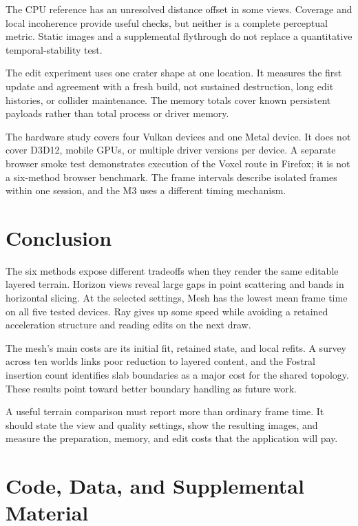 \documentclass{jcgt}
\begin{document}
The CPU reference has an unresolved distance offset in some views. Coverage and local incoherence provide useful checks, but neither is a complete perceptual metric. Static images and a supplemental flythrough do not replace a quantitative temporal-stability test.

The edit experiment uses one crater shape at one location. It measures the first update and agreement with a fresh build, not sustained destruction, long edit histories, or collider maintenance. The memory totals cover known persistent payloads rather than total process or driver memory.

The hardware study covers four Vulkan devices and one Metal device. It does not cover D3D12, mobile GPUs, or multiple driver versions per device. A separate browser smoke test demonstrates execution of the Voxel route in Firefox; it is not a six-method browser benchmark. The frame intervals describe isolated frames within one session, and the M3 uses a different timing mechanism.

\section{Conclusion}\label{sec:conclusion}

The six methods expose different tradeoffs when they render the same editable layered terrain. Horizon views reveal large gaps in point scattering and bands in horizontal slicing. At the selected settings, Mesh has the lowest mean frame time on all five tested devices. Ray gives up some speed while avoiding a retained acceleration structure and reading edits on the next draw.

The mesh's main costs are its initial fit, retained state, and local refits. A survey across ten worlds links poor reduction to layered content, and the Fostral insertion count identifies slab boundaries as a major cost for the shared topology. These results point toward better boundary handling as future work.

A useful terrain comparison must report more than ordinary frame time. It should state the view and quality settings, show the resulting images, and measure the preparation, memory, and edit costs that the application will pay.

\section*{Code, Data, and Supplemental Material}\label{sec:availability}
\end{document}
